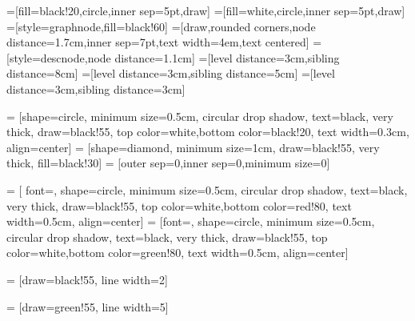 \documentclass[10pt,a4paper,parskip]{scrbook}
\begin{document}


=[fill=black!20,circle,inner sep=5pt,draw]
=[fill=white,circle,inner sep=5pt,draw]
=[style=graphnode,fill=black!60]
=[draw,rounded corners,node distance=1.7cm,inner sep=7pt,text width=4em,text centered]
=[style=descnode,node distance=1.1cm]
=[level distance=3cm,sibling distance=8cm]
=[level distance=3cm,sibling distance=5cm]
=[level distance=3cm,sibling distance=3cm]
  


 = [shape=circle, minimum size=0.5cm, circular drop shadow, text=black, very thick, draw=black!55, top color=white,bottom color=black!20, text width=0.3cm, align=center]
 = [shape=diamond, minimum size=1cm, draw=black!55, very thick, fill=black!30]
 = [outer sep=0,inner sep=0,minimum size=0]

 = [  font={\huge\bfseries}, shape=circle, minimum size=0.5cm, circular drop shadow, text=black, very thick, draw=black!55, top color=white,bottom color=red!80, text width=0.5cm, align=center]
 = [font={\huge\bfseries}, shape=circle, minimum size=0.5cm, circular drop shadow, text=black, very thick, draw=black!55, top color=white,bottom color=green!80, text width=0.5cm, align=center]

 = [draw=black!55, line width=2]

 = [draw=green!55, line width=5]
\end{document}
